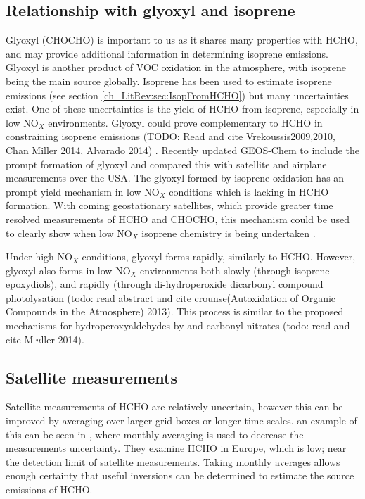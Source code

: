   \subsection{Relationship with glyoxyl and isoprene}
    Glyoxyl (CHOCHO) is important to us as it shares many properties with HCHO, and may provide additional information in determining isoprene emissions.
    Glyoxyl is another product of VOC oxidation in the atmosphere, with isoprene being the main source globally.
    Isoprene has been used to estimate isoprene emissions (see section \ref{ch_LitRev:sec:IsopFromHCHO}) but many uncertainties exist.
    One of these uncertainties is the yield of HCHO from isoprene, especially in low NO$_X$ environments.
    Glyoxyl could prove complementary to HCHO in constraining isoprene emissions (TODO: Read and cite Vrekoussis2009,2010, Chan Miller 2014, Alvarado 2014) \citep{Miller2017}.
    Recently \cite{Miller2017} updated GEOS-Chem to include the prompt formation of glyoxyl and compared this with satellite and airplane measurements over the USA.
    The glyoxyl formed by isoprene oxidation has an prompt yield mechanism in low NO$_X$ conditions which is lacking in HCHO formation.
    With coming geostationary satellites, which provide greater time resolved measurements of HCHO and CHOCHO, this mechanism could be used to clearly show when low NO$_X$ isoprene chemistry is being undertaken \citep{Miller2017}.
    
    Under high NO$_X$ conditions, glyoxyl forms rapidly, similarly to HCHO.
    However, glyoxyl also forms in low NO$_X$ environments both slowly (through isoprene epoxydiols), and rapidly (through di-hydroperoxide dicarbonyl compound photolysation (todo: read abstract and cite crounse(Autoxidation of Organic Compounds in the Atmosphere) 2013).
    This process is similar to the proposed mechanisms for hydroperoxyaldehydes by \citet{Peeters2014} and carbonyl nitrates (todo: read and cite M$\:{u}$ller 2014).
    
  \subsection{Satellite measurements}
    Satellite measurements of HCHO are relatively uncertain, however this can be improved by averaging over larger grid boxes or longer time scales.
    an example of this can be seen in \citet{Dufour2009}, where monthly averaging is used to decrease the measurements uncertainty.
    They examine HCHO in Europe, which is low; near the detection limit of satellite measurements.
    Taking monthly averages allows enough certainty that useful inversions can be determined to estimate the source emissions of HCHO.
    
